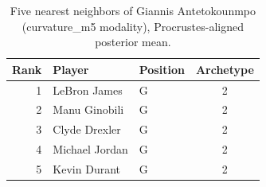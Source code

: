 \begin{table}[htbp]
  \centering\small
  \begin{tabular}{rllc}
    \toprule
    Rank & Player & Position & Archetype \\
    \midrule
    1 & LeBron James & G & 2 \\
    2 & Manu Ginobili & G & 2 \\
    3 & Clyde Drexler & G & 2 \\
    4 & Michael Jordan & G & 2 \\
    5 & Kevin Durant & G & 2 \\
    \bottomrule
  \end{tabular}
  \caption{Five nearest neighbors of Giannis Antetokounmpo (curvature_m5 modality), Procrustes-aligned posterior mean.}
  \label{tab:Giannis_Antetokounmpo_neighbors_curvature_m5}
\end{table}

